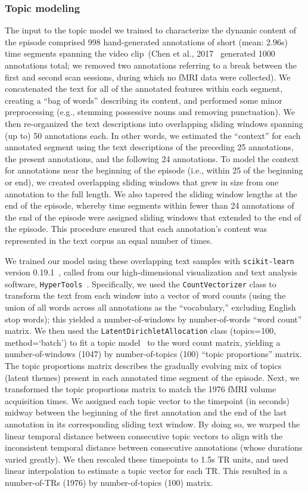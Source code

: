 \documentclass[10pt]{article}
\begin{document}
\subsubsection*{Topic modeling}
The input to the topic model we trained to characterize the dynamic content of the episode comprised 998 hand-generated annotations of short (mean: 2.96s) time segments spanning the video clip~(Chen et al., 2017~\citep{ChenEtal17} generated 1000 annotations total; we removed two annotations referring to a break between the first and second scan sessions, during which no fMRI data were collected).  We concatenated the text for all of the annotated features within each segment, creating a ``bag of words'' describing its content, and performed some minor preprocessing (e.g., stemming possessive nouns and removing punctuation).  We then re-organized the text descriptions into overlapping sliding windows spanning (up to) 50 annotations each.  In other words, we estimated the ``context'' for each annotated segment using the text descriptions of the preceding 25 annotations, the present annotations, and the following 24 annotations.  To model the context for annotations near the beginning of the episode (i.e., within 25 of the beginning or end), we created overlapping sliding windows that grew in size from one annotation to the full length.  We also tapered the sliding window lengths at the end of the episode, whereby time segments within fewer than 24 annotations of the end of the episode were assigned sliding windows that extended to the end of the episode.  This procedure ensured that each annotation's content was represented in the text corpus an equal number of times.

We trained our model using these overlapping text samples with \texttt{scikit-learn} version 0.19.1~\citep{PedrEtal11}, called from our high-dimensional visualization and text analysis software, \texttt{HyperTools}~\citep{HeusEtal18a}.  Specifically, we used the \texttt{CountVectorizer} class to transform the text from each window into a vector of word counts (using the union of all words across all annotations as the ``vocabulary,'' excluding English stop words); this yielded a number-of-windows by number-of-words ``word count'' matrix.  We then used the \texttt{LatentDirichletAllocation} class (topics=100, method=`batch') to fit a topic model~\citep{BleiEtal03} to the word count matrix, yielding a number-of-windows (1047) by number-of-topics (100) ``topic proportions'' matrix.  The topic proportions matrix describes the gradually evolving mix of topics (latent themes) present in each annotated time segment of the episode.  Next, we transformed the topic proportions matrix to match the 1976 fMRI volume acquisition times.  We assigned each topic vector to the timepoint (in seconds) midway between the beginning of the first annotation and the end of the last annotation in its corresponding sliding text window.  By doing so, we warped the linear temporal distance between consecutive topic vectors to align with the inconsistent temporal distance between consecutive annotations (whose durations varied greatly).  We then rescaled these timepoints to 1.5s TR units, and used linear interpolation to estimate a topic vector for each TR.  This resulted in a number-of-TRs (1976) by number-of-topics (100) matrix.
\end{document}

